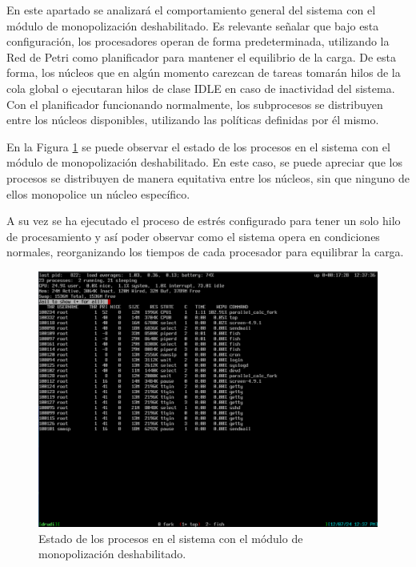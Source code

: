 En este apartado se analizará el comportamiento general del sistema con el módulo de monopolización deshabilitado. Es relevante señalar que bajo esta configuración, los procesadores operan de forma predeterminada, utilizando la Red de Petri como planificador para mantener el equilibrio de la carga. De esta forma, los núcleos que en algún momento carezcan de tareas tomarán hilos de la cola global o ejecutaran hilos de clase IDLE en caso de inactividad del sistema. Con el planificador funcionando normalmente, los subprocesos se distribuyen entre los núcleos disponibles, utilizando las políticas definidas por él mismo.\par

En la Figura \ref{fig:top_disabled} se puede observar el estado de los procesos en el sistema con el módulo de monopolización deshabilitado. En este caso, se puede apreciar que los procesos se distribuyen de manera equitativa entre los núcleos, sin que ninguno de ellos monopolice un núcleo específico.\par

A su vez se ha ejecutado el proceso de estrés configurado para tener un solo hilo de procesamiento y así poder observar como el sistema opera en condiciones normales, reorganizando los tiempos de cada procesador para equilibrar la carga.\par

\begin{figure}[H]
    \centering
    \includegraphics[width=1\textwidth]{images/top_disabled.png}
    \caption{Estado de los procesos en el sistema con el módulo de monopolización deshabilitado.}
    \label{fig:top_disabled}
\end{figure}

